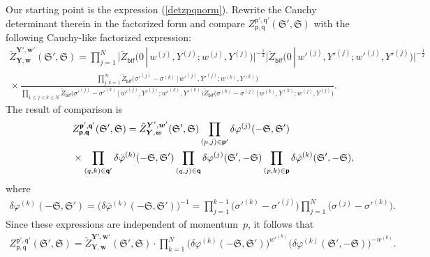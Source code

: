\documentclass[pdftex]{sigma}
\newcommand{\bs}{\boldsymbol}
\numberwithin{equation}{section}
\begin{document}
Our starting point is the expression (\ref{detzpqnorm}). Rewrite the Cauchy determinant therein in the factorized form and compare $Z^{\boldsymbol{\mathsf p}',\boldsymbol{\mathsf q}'}_{\boldsymbol{\mathsf p},\boldsymbol{\mathsf q}} (\mathfrak S', \mathfrak S)$ with the following Cauchy-like factorized expression:
\begin{gather*}
{\tilde{Z}}^{\bs Y', \bs w'}_{\bs Y, \bs w} (\mathfrak S', \mathfrak S)=
\prod_{j=1}^N \bigl|\tilde Z_{\mathsf{bif}}\big(0\,|\,w^{(j)},Y^{(j)};w^{(j)},Y^{(j)}\big)\bigr|^{-\frac12}
\bigl|\tilde Z_{\mathsf{bif}}\big(0\,|\,{w'}^{(j)},{Y'}^{(j)};{w'}^{(j)},{Y'}^{(j)}\big)\bigr|^{-\frac12}\\
{}\times
\frac{\prod\limits_{j,k=1}^N \tilde Z_{\mathsf{bif}}\big({\sigma'}^{(j)}-\sigma^{(k)} \,|\,{w'}^{(j)},{Y'}^{(j)};w^{(k)},Y^{(k)}\big)}{
\!\!\prod\limits_{1\le j<k \le N}\!\!\tilde Z_{\mathsf{bif}}\bigl({\sigma'}^{(j)}-{\sigma'}^{(k)}\,|\,{w'}^{(j)},{Y'}^{(j)};{w'}^{(k)},{Y'}^{(k)}\bigr)
{ \tilde Z_{\mathsf{bif}}\big({\sigma}^{(k)}-{\sigma}^{(j)}\,|\,w^{(k)},Y^{(k)};w^{(j)},Y^{(j)}\big)}}.
\end{gather*}
The result of comparison is
\begin{gather*}\label{zpqzyw}
Z^{\boldsymbol{\mathsf p}',\boldsymbol{\mathsf q}'}_{\boldsymbol{\mathsf p},\boldsymbol{\mathsf q}}
(\mathfrak S', \mathfrak S) =
{\tilde{Z}}^{\bs Y', \bs w'}_{\bs Y, \bs w} (\mathfrak S', \mathfrak S) \prod_{(p,j)\in\boldsymbol{\mathsf p}'}
\delta \varphi^{(j)}(-\mathfrak S,\mathfrak S')\\
\hphantom{Z^{\boldsymbol{\mathsf p}',\boldsymbol{\mathsf q}'}_{\boldsymbol{\mathsf p},\boldsymbol{\mathsf q}}
(\mathfrak S', \mathfrak S) =}{}\times \prod_{(q,k)\in\boldsymbol{\mathsf q}'}
\delta \bar\varphi^{(k)}(-\mathfrak S,\mathfrak S')
\prod_{(q,j)\in\boldsymbol{\mathsf q}} \delta \varphi^{(j)}(\mathfrak S',-\mathfrak S)
\prod_{(p,k)\in\boldsymbol{\mathsf p}} \delta\bar\varphi^{(k)}(\mathfrak S',-\mathfrak S),
\end{gather*}
where
\begin{gather}\label{dphi}
\delta \varphi^{(k)}(-\mathfrak S,\mathfrak S')=\big(\delta \bar\varphi^{(k)}(-\mathfrak S,\mathfrak S') \big)^{-1}=
\prod_{j=1}^{k-1} \big({\sigma'}^{(k)}-{\sigma'}^{(j)} \big)\prod_{j=1}^N \big(\sigma^{(j)}-{\sigma'}^{(k)} \big).
\end{gather}
Since these expressions are independent of momentum~$p$, it follows that
\begin{gather}\label{zpqzywred}
Z^{\boldsymbol{\mathsf p}',\boldsymbol{\mathsf q}'}_{\boldsymbol{\mathsf p},\boldsymbol{\mathsf q}}
(\mathfrak S', \mathfrak S) = {\tilde{Z}}^{\bs Y', \bs w'}_{\bs Y, \bs w} (\mathfrak S', \mathfrak S)\cdot
\prod_{k=1}^N
\big(\delta \varphi^{(k)}(-\mathfrak S,\mathfrak S')\big) ^{{w'}^{(k)}}
\big(\delta \varphi^{(k)}(\mathfrak S',-\mathfrak S) \big) ^{-{w}^{(k)}}.
\end{gather}
\end{document}
